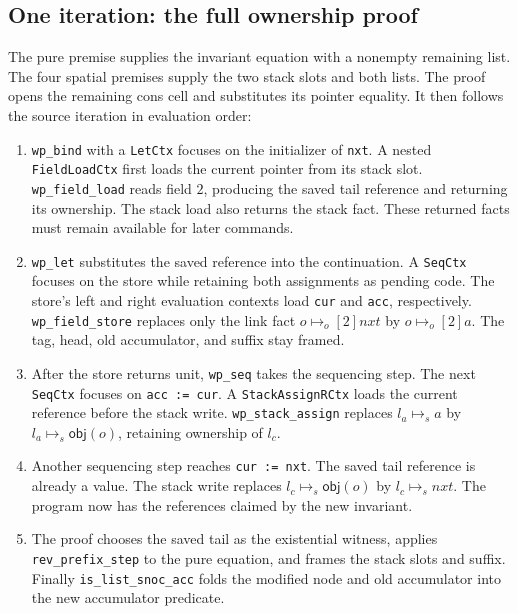 \documentclass[11pt]{article}
\newcommand{\ptss}{\mathrel{\mapsto_{s}}}
\newcommand{\ptso}{\mathrel{\mapsto_{o}}}
\begin{document}
\subsection{One iteration: the full ownership proof}



The pure premise supplies the invariant equation with a nonempty remaining
list. The four spatial premises supply the two stack slots and both lists.
The proof opens the remaining cons cell and substitutes its pointer equality.
It then follows the source iteration in evaluation order:
\begin{enumerate}
\item \texttt{wp\_bind} with a \texttt{LetCtx} focuses on the initializer of
\texttt{nxt}. A nested \texttt{FieldLoadCtx} first loads the current pointer
from its stack slot. \texttt{wp\_field\_load} reads field \(2\), producing the
saved tail reference and returning its ownership. The stack load also returns
the stack fact. These returned facts must remain available for later commands.
\item \texttt{wp\_let} substitutes the saved reference into the continuation.
A \texttt{SeqCtx} focuses on the store while retaining both assignments as
pending code. The store's left and right evaluation contexts load \texttt{cur}
and \texttt{acc}, respectively. \texttt{wp\_field\_store} replaces only the
link fact \(o\ptso[2]\mathit{nxt}\) by \(o\ptso[2]a\).
The tag, head, old accumulator, and suffix stay framed.
\item After the store returns unit, \texttt{wp\_seq} takes the sequencing
step. The next \texttt{SeqCtx} focuses on \texttt{acc := cur}.
A \texttt{StackAssignRCtx} loads the current reference before the stack write.
\texttt{wp\_stack\_assign} replaces \(l_a\ptss a\) by
\(l_a\ptss\mathsf{obj}(o)\), retaining ownership of \(l_c\).
\item Another sequencing step reaches \texttt{cur := nxt}. The saved tail
reference is already a value. The stack write replaces
\(l_c\ptss\mathsf{obj}(o)\) by \(l_c\ptss\mathit{nxt}\).
The program now has the references claimed by the new invariant.
\item The proof chooses the saved tail as the existential witness, applies
\texttt{rev\_prefix\_step} to the pure equation, and frames the stack slots and
suffix. Finally \texttt{is\_list\_snoc\_acc} folds the modified node and old
accumulator into the new accumulator predicate.
\end{enumerate}
\end{document}
